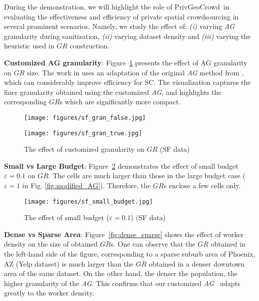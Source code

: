\documentclass{USC-Thesis}
\newcommand{\PGC}{{PrivGeoCrowd}}
\numberwithin{equation}{chapter}
\begin{document}
During the demonstration, we will highlight the role of \PGC\ in evaluating the effectiveness and efficiency of private spatial crowdsourcing in several prominent scenarios. Namely, we study the effect of: {\em (i)} varying {\em AG} granularity during sanitization, {\em (ii)} varying dataset density and {\em (iii)} varying the heuristic used in $GR$ construction.

\textbf{Customized AG granularity}: Figure~\ref{fig:customized_gran} presents the effect of AG granularity on $\mathit{GR}$ size. The work in \cite{to2014framework} uses an adaptation of the original {\em AG} method from \cite{qardaji2012differentially}, which can considerably improve efficiency for SC. The visualization captures the finer granularity obtained using the customized {\em AG}, and highlights the corresponding $\mathit{GR}$s which are significantly more compact.

\begin{figure}[!ht]
	\centering
	\begin{minipage}[b]{0.35\linewidth}
		\texttt{[image: figures/sf\_gran\_false.jpg]}
		\label{fig:original_AG}
	\end{minipage}
	\hspace{1cm}
	\centering
	\begin{minipage}[b]{0.35\linewidth}
		\texttt{[image: figures/sf\_gran\_true.jpg]}
		\label{fig:modified_AG}
	\end{minipage}
	\caption{The effect of customized granularity on $\mathit{GR}$ (SF data)}
\label{fig:customized_gran}
\end{figure}

\textbf{Small vs Large Budget}: Figure~\ref{fig:budget} demonstrates the effect of small budget $\varepsilon=0.1$ on $\mathit{GR}$. The cells are much larger than those in the large budget case ($\varepsilon=1$ in Fig. \ref{fig:modified_AG}). Therefore, the $\mathit{GR}$s enclose a few cells only.

\begin{figure}[!htb]
\centering
		\texttt{[image: figures/sf\_small\_budget.jpg]}
	\caption{The effect of small budget ($\varepsilon=0.1$) (SF data)}
\label{fig:budget}
\end{figure}
   
\textbf{Dense vs Sparse Area}: Figure~\ref{fig:dense_sparse} shows the effect of worker density on the size of obtained $\mathit{GR}$s. One can observe that the $\mathit{GR}$ obtained in the left-hand side of the figure, corresponding to a sparse suburb area of Phoenix, AZ (Yelp dataset) is much larger than the $\mathit{GR}$ obtained in a denser downtown area of the same dataset. On the other hand, the denser the population, the higher granularity of the {\em AG}. This confirms that our customized {\em AG}~\cite{to2014framework} adapts greatly to the worker density.
\end{document}
